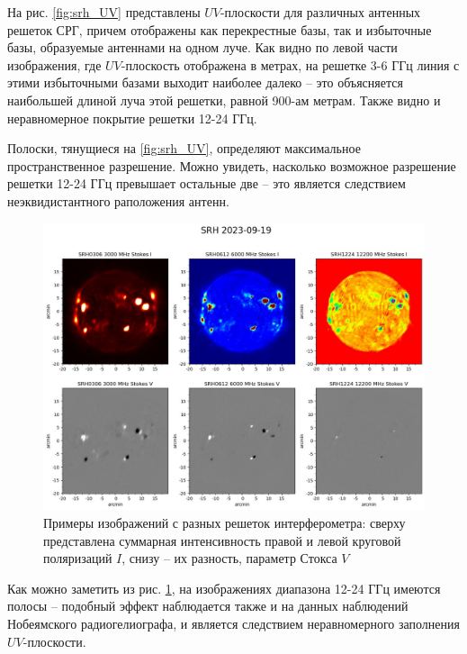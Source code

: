 На рис. \ref{fig:srh_UV} представлены $UV$-плоскости для различных антенных решеток СРГ, причем отображены как перекрестные базы, так и избыточные базы, образуемые антеннами на одном луче. Как видно по левой части изображения, где $UV$-плоскость отображена в метрах, на решетке 3-6 ГГц линия с этими избыточными базами выходит наиболее далеко -- это объясняется наибольшей длиной луча этой решетки, равной 900-ам метрам. Также видно и неравномерное покрытие решетки 12-24 ГГц.

Полоски, тянущиеся на \ref{fig:srh_UV}, определяют максимальное пространственное разрешение. Можно увидеть, насколько возможное разрешение решетки 12-24 ГГц превышает остальные две -- это является следствием неэквидистантного раположения антенн.

\begin{figure}[H]
	\centering
	\includegraphics[scale=0.9]{images/img_example}
	\caption{Примеры изображений с разных решеток интерферометра: сверху представлена суммарная интенсивность правой и левой круговой поляризаций $I$, снизу -- их разность, параметр Стокса $V$}
	\label{fig:img_example}
\end{figure}

Как можно заметить из рис. \ref{fig:img_example}, на изображениях диапазона 12-24 ГГц имеются полосы -- подобный эффект наблюдается также и на данных наблюдений Нобеямского радиогелиографа, и является следствием неравномерного заполнения $UV$-плоскости.


